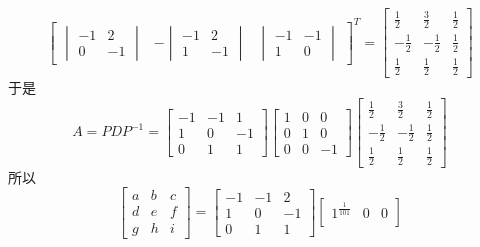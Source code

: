 \begin{questions}
\begin{solution}
\[\begin{bmatrix}
        \begin{vmatrix} -1 & 2 \\ 0 & -1 \end{vmatrix} & -\begin{vmatrix} -1 & 2 \\ 1 & -1 \end{vmatrix} & \begin{vmatrix} -1 & -1 \\ 1 & 0 \end{vmatrix}
        \end{bmatrix}^T
        =\begin{bmatrix}
        \frac{1}{2} & \frac{3}{2} & \frac{1}{2} \\
        -\frac{1}{2} & -\frac{1}{2} & \frac{1}{2} \\
        \frac{1}{2} & \frac{1}{2} & \frac{1}{2}
        \end{bmatrix}
        \]
        于是
        \[
        A = P D P^{-1} =
        \begin{bmatrix}
        -1 & -1 & 1 \\
        1 & 0 & -1 \\
        0 & 1 & 1
        \end{bmatrix}
        \begin{bmatrix}
        1 & 0 & 0 \\
        0 & 1 & 0 \\
        0 & 0 & -1
        \end{bmatrix}
        \begin{bmatrix}
        \frac{1}{2} & \frac{3}{2} & \frac{1}{2} \\
        -\frac{1}{2} & -\frac{1}{2} & \frac{1}{2} \\
        \frac{1}{2} & \frac{1}{2} & \frac{1}{2}
        \end{bmatrix}
        \]
        所以
        \[
        \begin{bmatrix}
        a & b & c \\
        d & e & f \\
        g & h & i
        \end{bmatrix}
        =
        \begin{bmatrix}
        -1 & -1 & 2 \\
        1 & 0 & -1 \\
        0 & 1 & 1
        \end{bmatrix}
        \begin{bmatrix}
        1^{\frac{1}{101}} & 0 & 0 \\

\end{bmatrix}\]
\end{solution}
\end{questions}
